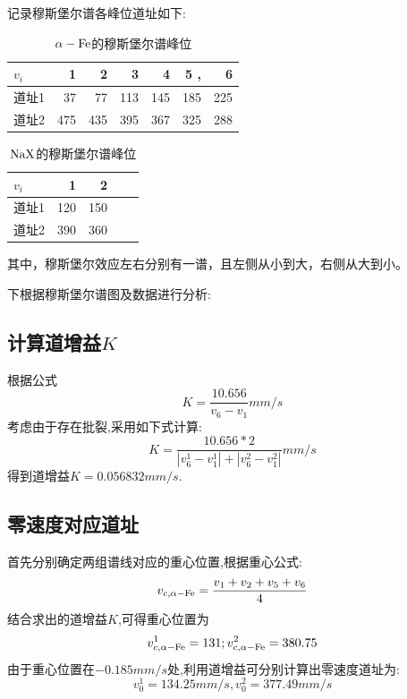 \documentclass[aps,pre,12pt,preprint,onecolumn,showpacs,showkeys]{revtex4-1}
\begin{document}
记录穆斯堡尔谱各峰位道址如下:\par
\begin{table}[htbp]
    \begin{ruledtabular}
    \centering
        \begin{tabular}{lrrrrrr}
            \toprule
            {$v_i$} &   1 &    2 &    3 &    4 &    5 ,&    6 \\
            \midrule
            道址1 &  37 &  77 &  113 &  145 &  185 &  225 \\
            道址2 &  475 &  435 &  395 &  367 &  325 &  288 \\
            \bottomrule
        \end{tabular}
    \end{ruledtabular}
    \caption{$\alpha-\rm{Fe}$的穆斯堡尔谱峰位}
\end{table}
\begin{table}[htbp]
    \begin{ruledtabular}
    \centering
        \begin{tabular}{lrrrr}
            \toprule
            {$v_i$} &    1 &    2 \\
            \midrule
            道址1 &  120 &  150 \\
            道址2 &  390 &  360 \\
            \bottomrule
        \end{tabular}
    \end{ruledtabular}
    其中，穆斯堡尔效应左右分别有一谱，且左侧从小到大，右侧从大到小。
    \caption{$\rm{NaX}$的穆斯堡尔谱峰位}
\end{table}
下根据穆斯堡尔谱图及数据进行分析:
\subsection{计算道增益$K$}
根据公式
$$K=\frac{10.656}{v_6-v_1}\si{mm\per s}$$
考虑由于存在批裂,采用如下式计算:
$$K=\frac{10.656*2}{|v^1_6-v^1_1|+|v^2_6-v^2_1|}\si{mm\per s}$$
得到道增益$K=0.056832\si{mm\per s}$.
\subsection{零速度对应道址}
首先分别确定两组谱线对应的重心位置,根据重心公式:
$$v_{c,\alpha-\rm{Fe}}=\frac{v_1+v_2+v_5+v_6}{4}$$
结合求出的道增益$K$,可得重心位置为
$$v^1_{c,\alpha-\rm{Fe}}=131;v^2_{c,\alpha-\rm{Fe}}=380.75$$
由于重心位置在$-0.185\si{mm\per s}$处,利用道增益可分别计算出零速度道址为:
$$v^1_{0}=134.25\si{mm\per s},v^2_0=377.49\si{mm\per s}$$
\end{document}
